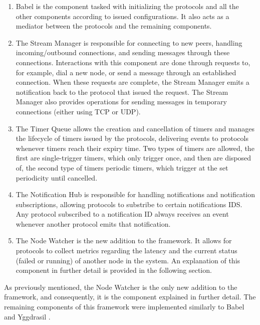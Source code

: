 \begin{enumerate}

    \item Babel is the component tasked with initializing the protocols and all the other components according to issued configurations. It also acts as a mediator between the protocols and the remaining components.

    \item The Stream Manager is responsible for connecting to new peers, handling incoming/outbound connections, and sending messages through these connections. Interactions with this component are done through requests to, for example, dial a new node, or send a message through an established connection. When these requests are complete, the Stream Manager emits a notification back to the protocol that issued the request. The Stream Manager also provides operations for sending messages in temporary connections (either using TCP or UDP).

    \item The Timer Queue allows the creation and cancellation of timers and manages the lifecycle of timers issued by the protocols, delivering events to protocols whenever timers reach their expiry time. Two types of timers are allowed, the first are single-trigger timers, which only trigger once, and then are disposed of, the second type of timers periodic timers, which trigger at the set periodicity until cancelled.

    \item The Notification Hub is responsible for handling notifications and notification subscriptions, allowing protocols to substribe to certain notifications IDS. Any protocol subscribed to a notification ID always receives an event whenever another protocol emits that notification.

    \item The Node Watcher is the new addition to the framework. It allows for protocols to collect metrics regarding the latency and the current status (failed or running) of another node in the system. An explanation of this component in further detail is provided in the following section.

\end{enumerate}

As previously mentioned, the  Node Watcher is the only new addition to the framework, and consequently, it is the component explained in further detail. The remaining components of this framework were implemented similarly to Babel \cite{babel}  and Yggdrasil \cite{akosThesis}.


